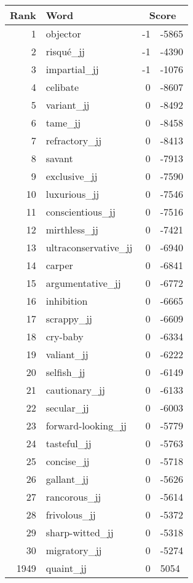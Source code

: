 \begin{longtable}[!htbp]{| rlr@{.}l |}
    \hline
    \textbf{Rank} & \textbf{Word} & \multicolumn{2}{c|}{\textbf{Score}} \\
    \hline
    \endhead
    1 & objector & -1 & -5865 \\
    2 & risqué\_jj & -1 & -4390 \\
    3 & impartial\_jj & -1 & -1076 \\
    4 & celibate & 0 & -8607 \\
    5 & variant\_jj & 0 & -8492 \\
    6 & tame\_jj & 0 & -8458 \\
    7 & refractory\_jj & 0 & -8413 \\
    8 & savant & 0 & -7913 \\
    9 & exclusive\_jj & 0 & -7590 \\
    10 & luxurious\_jj & 0 & -7546 \\
    11 & conscientious\_jj & 0 & -7516 \\
    12 & mirthless\_jj & 0 & -7421 \\
    13 & ultraconservative\_jj & 0 & -6940 \\
    14 & carper & 0 & -6841 \\
    15 & argumentative\_jj & 0 & -6772 \\
    16 & inhibition & 0 & -6665 \\
    17 & scrappy\_jj & 0 & -6609 \\
    18 & cry-baby & 0 & -6334 \\
    19 & valiant\_jj & 0 & -6222 \\
    20 & selfish\_jj & 0 & -6149 \\
    21 & cautionary\_jj & 0 & -6133 \\
    22 & secular\_jj & 0 & -6003 \\
    23 & forward-looking\_jj & 0 & -5779 \\
    24 & tasteful\_jj & 0 & -5763 \\
    25 & concise\_jj & 0 & -5718 \\
    26 & gallant\_jj & 0 & -5626 \\
    27 & rancorous\_jj & 0 & -5614 \\
    28 & frivolous\_jj & 0 & -5372 \\
    29 & sharp-witted\_jj & 0 & -5318 \\
    30 & migratory\_jj & 0 & -5274 \\
    1949 & quaint\_jj & 0 & 5054 \\

\end{longtable}
